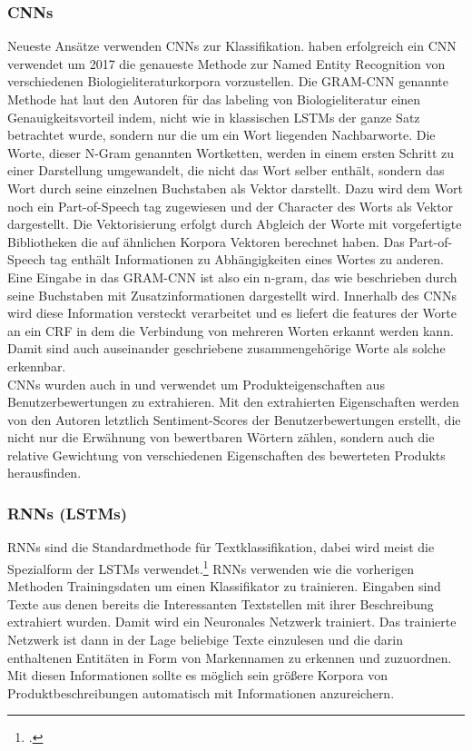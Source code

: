 \documentclass[paper=a4,12pt,listof=totoc]{scrartcl}%
\begin{document}
	\subsubsection{CNNs}
	Neueste Ansätze verwenden CNNs zur Klassifikation. \cite{Zhu.2018} haben erfolgreich ein CNN verwendet um 2017 die genaueste Methode zur Named Entity Recognition von verschiedenen Biologieliteraturkorpora vorzustellen. Die GRAM-CNN genannte Methode hat laut den Autoren für das labeling von Biologieliteratur einen Genauigkeitsvorteil indem, nicht wie in klassischen LSTMs der ganze Satz betrachtet wurde, sondern nur die um ein Wort liegenden Nachbarworte. Die Worte, dieser N-Gram genannten Wortketten, werden in einem ersten Schritt zu einer Darstellung umgewandelt, die nicht das Wort selber enthält, sondern das Wort durch seine einzelnen Buchstaben als Vektor darstellt. Dazu wird dem Wort noch ein Part-of-Speech tag zugewiesen und der Character des Worts als Vektor dargestellt. 
	Die Vektorisierung erfolgt durch Abgleich der Worte mit vorgefertigte Bibliotheken die auf ähnlichen Korpora Vektoren berechnet haben. Das Part-of-Speech tag enthält Informationen zu Abhängigkeiten eines Wortes zu anderen. Eine Eingabe in das GRAM-CNN ist also ein n-gram, das wie beschrieben durch seine Buchstaben mit Zusatzinformationen dargestellt wird.
	Innerhalb des CNNs wird diese Information versteckt verarbeitet und es liefert die features der Worte an ein CRF in dem die Verbindung von mehreren Worten erkannt werden kann. Damit sind auch auseinander geschriebene zusammengehörige Worte als solche erkennbar.\\
	CNNs wurden auch in \cite{Lee.2019} und \cite{Lee.2020} verwendet um Produkteigenschaften aus Benutzerbewertungen zu extrahieren. Mit den extrahierten Eigenschaften werden von den Autoren letztlich Sentiment-Scores der Benutzerbewertungen erstellt, die nicht nur die Erwähnung von bewertbaren Wörtern zählen, sondern auch die relative Gewichtung von verschiedenen Eigenschaften des bewerteten Produkts herausfinden.\\
	\subsubsection{RNNs (LSTMs)}
	RNNs sind die Standardmethode für Textklassifikation, dabei wird meist die Spezialform der LSTMs verwendet.\footcite{Majumder.30.03.2018}
	RNNs verwenden wie die vorherigen Methoden Trainingsdaten um einen Klassifikator zu trainieren. Eingaben sind Texte aus denen bereits die Interessanten Textstellen mit ihrer Beschreibung extrahiert wurden. Damit wird ein Neuronales Netzwerk trainiert.
	Das trainierte Netzwerk ist dann in der Lage beliebige Texte einzulesen und die darin enthaltenen Entitäten in Form von Markennamen zu erkennen und zuzuordnen. Mit diesen Informationen sollte es möglich sein größere Korpora von Produktbeschreibungen automatisch mit Informationen anzureichern.
	
\end{document}
